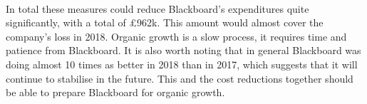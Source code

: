 \documentclass[]{article}
\begin{document}
\paragraph{}
In total these measures could reduce Blackboard's expenditures quite significantly, with a total of £962k. This amount would almost cover the company's loss in 2018. Organic growth is a slow process, it requires time and patience from Blackboard. It is also worth noting that in general Blackboard was doing almost 10 times as better in 2018 than in 2017, which suggests that it will continue to stabilise in the future. This and the cost reductions together should be able to prepare Blackboard for organic growth.

\newpage





\printbibliography{}
\end{document}
